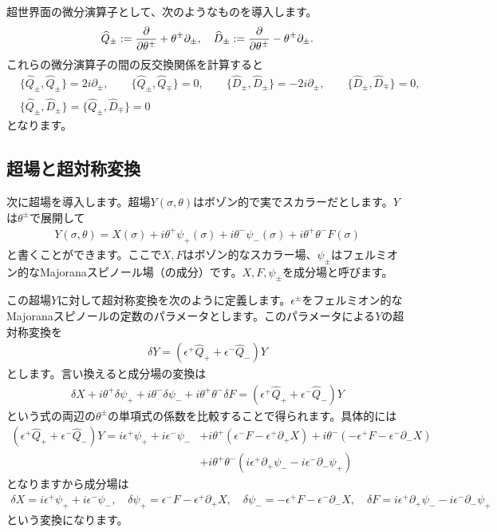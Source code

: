 \documentclass[report,paper=a4, fontsize=12pt, line_length=16cm, number_of_lines=34,dvipdfmx]{jlreq}
\numberwithin{equation}{chapter}
\numberwithin{equation}{section}
\newcommand{\del}{\partial}
\newcommand{\Qd}{\widehat{Q}}
\newcommand{\Dd}{\widehat{D}}
\begin{document}
超世界面の微分演算子として、次のようなものを導入します。
\begin{align}
  \Qd_{\pm}:=\pdv{\theta^{\pm}}+\theta^{\pm}\del_{\pm},\quad
  \Dd_{\pm}:=\pdv{\theta^{\pm}}-\theta^{\pm}\del_{\pm}.
\end{align}
これらの微分演算子の間の反交換関係を計算すると
\begin{align}
&  \{\Qd_{\pm},\Qd_{\pm}\}=2i\del_{\pm},\qquad 
  \{\Qd_{\pm},\Qd_{\mp}\}=0,\qquad 
  \{\Dd_{\pm},\Dd_{\pm}\}=-2i\del_{\pm},\qquad 
  \{\Dd_{\pm},\Dd_{\mp}\}=0,\nonumber\\
& \{\Qd_{\pm},\Dd_{\pm}\}=\{\Qd_{\pm},\Dd_{\mp}\}=0
\end{align}
となります。

\subsection{超場と超対称変換}
次に超場を導入します。超場$Y(\sigma,\theta)$はボゾン的で実でスカラーだとします。$Y$は$\theta^{\pm}$で展開して
\begin{align}
  Y(\sigma,\theta)=X(\sigma)+i\theta^{+}\psi_{+}(\sigma)+i\theta^{-}\psi_{-}(\sigma)+i\theta^{+}\theta^{-}F(\sigma)
\end{align}
と書くことができます。ここで$X,F$はボゾン的なスカラー場、$\psi_{\pm}$はフェルミオン的なMajoranaスピノール場（の成分）です。$X,F,\psi_{\pm}$を成分場と呼びます。

この超場$Y$に対して超対称変換を次のように定義します。$\epsilon^{\pm}$をフェルミオン的なMajoranaスピノールの定数のパラメータとします。このパラメータによる$Y$の超対称変換を
\begin{align}
  \delta Y = (\epsilon^{+}\Qd_{+}+\epsilon^{-}\Qd_{-})Y\label{superfieldtransf}
\end{align}
とします。言い換えると成分場の変換は
\begin{align}
  \delta X+i\theta^{+}\delta \psi_{+}+i\theta^{-}\delta \psi_{-}+i\theta^{+}\theta^{-}\delta F = (\epsilon^{+}\Qd_{+}+\epsilon^{-}\Qd_{-})Y
\end{align}
という式の両辺の$\theta^{\pm}$の単項式の係数を比較することで得られます。具体的には
\begin{align}
  (\epsilon^{+}\Qd_{+}+\epsilon^{-}\Qd_{-})Y=i\epsilon^{+}\psi_{+}+i\epsilon^{-}\psi_{-} 
  &+ i\theta^{+}(\epsilon^{-}F-\epsilon^{+}\del_{+}X)
  + i\theta^{-}(-\epsilon^{+}F-\epsilon^{-}\del_{-}X)\nonumber\\
  &+i\theta^{+}\theta^{-}
  (i\epsilon^{+}\del_{+}\psi_{-}-i\epsilon^{-}\del_{-}\psi_{+})
\end{align}
となりますから成分場は
\begin{align}
  \delta X=i\epsilon^{+}\psi_{+}+i\epsilon^{-}\psi_{-} ,\quad
  \delta \psi_{+}=\epsilon^{-}F-\epsilon^{+}\del_{+}X,\quad
  \delta \psi_{-}=-\epsilon^{+}F-\epsilon^{-}\del_{-}X,\quad
  \delta F=i\epsilon^{+}\del_{+}\psi_{-}-i\epsilon^{-}\del_{-}\psi_{+}
\end{align}
という変換になります。
\end{document}

